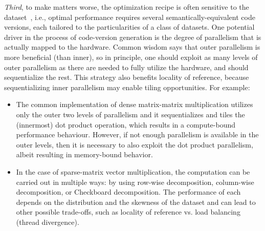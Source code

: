 
{\em Third}, to make matters worse, the optimization recipe is often sensitive to the dataset~\cite{FinPar:TACO}, i.e., optimal performance requires several semantically-equivalent code versions, each tailored to the particularities of a class of datasets.   One potential driver in the process of code-version generation is the degree of parallelism that is actually mapped to the hardware. Common wisdom says that outer parallelism is more beneficial (than inner), so in principle, one should exploit as many levels of outer parallelism as there are needed to fully utilize the hardware, and should sequentialize the rest.  This strategy also benefits locality of reference, because sequentializing inner parallelism may enable tiling opportunities. For example:
\begin{itemize}
    \item The common implementation of dense matrix-matrix multiplication utilizes only the outer two levels of parallelism and it sequentializes and tiles the (innermost) dot product operation, which results in a compute-bound performance behaviour.   However, if not enough parallelism is available in the outer levels, then it is necessary to also exploit the dot product parallelism, albeit resulting in memory-bound behavior.
    \item In the case of sparse-matrix vector multiplication, the computation can be carried out in multiple ways: by using row-wise decomposition, column-wise decomposition, or Checkboard decomposition.   The performance of each depends on the distribution and the skewness of the dataset and can lead to other possible trade-offs, such as locality of reference vs. load balancing (thread divergence).
\end{itemize}

